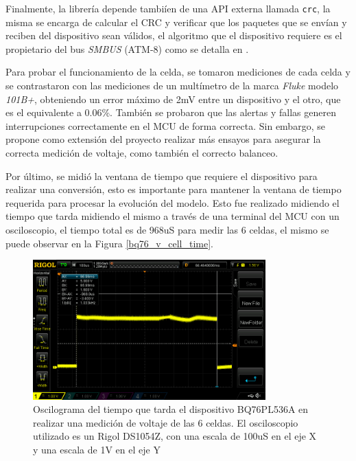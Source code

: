\documentclass[10pt, a4paper]{article}
\begin{document}
Finalmente, la librer\'ia depende tambi\'ien de una \acrshort{API} externa
llamada \texttt{crc}, la misma se encarga de calcular el \acrshort{CRC} y 
verificar que los paquetes que se env\'ian y reciben del dispositivo sean
v\'alidos, el algoritmo que el dispositivo requiere es el propietario del bus
\emph{SMBUS} (ATM-8) como se detalla en \cite{bq76_comm_basics}.

Para probar el funcionamiento de la celda, se tomaron mediciones de cada celda 
y se contrastaron con las mediciones de un mult\'imetro de la marca \emph{Fluke}
modelo \emph{101B+}, obteniendo un error m\'aximo de 2mV entre un dispositivo y
el otro, que es el equivalente a 0.06\%. Tambi\'en se probaron que las alertas y
fallas generen interrupciones correctamente en el \acrshort{MCU} de forma
correcta. Sin embargo, se propone como extensi\'on del proyecto realizar m\'as
ensayos para asegurar la correcta medici\'on de voltaje, como tambi\'en el
correcto balanceo.

Por \'ultimo, se midi\'o la ventana de tiempo que requiere el dispositivo para
realizar una conversi\'on, esto es importante para mantener la ventana de tiempo
requerida para procesar la evoluci\'on del modelo. Esto fue realizado midiendo
el tiempo que tarda midiendo el mismo a trav\'es de una terminal del
\acrshort{MCU} con un osciloscopio, el tiempo total es de 968uS para medir las 6
celdas, el mismo se puede observar en la Figura \ref{bq76_v_cell_time}.

\begin{figure}[h!]
    \begin{center}
        \includegraphics[width=0.8\textwidth]{bq76_v_cell_time.png}
        \caption{Oscilograma del tiempo que tarda el dispositivo BQ76PL536A en
        realizar una medici\'on de voltaje de las 6 celdas. El osciloscopio
        utilizado es un Rigol DS1054Z, con una escala de 100uS en el eje X y una
        escala de 1V en el eje Y}
    \end{center}
\end{figure}
\end{document}
